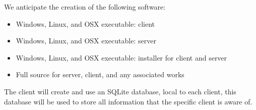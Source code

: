 We anticipate the creation of the following software:

\begin{itemize}
\item Windows, Linux, and OSX executable: client
\item Windows, Linux, and OSX executable: server
\item Windows, Linux, and OSX executable: installer for client and server
\item Full source for server, client, and any associated works
\end{itemize} 

The client will create and use an SQLite database, local to each client, this
database will be used to store all information that the specific client is aware
of.
